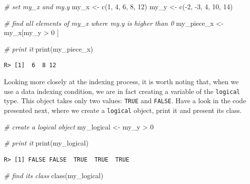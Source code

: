 \documentclass[
  12pt,
]{book}
\newenvironment{Shaded}{\begin{snugshade}}{\end{snugshade}}
\newcommand{\CommentTok}[1]{\textcolor[rgb]{0.37,0.37,0.37}{\textit{#1}}}
\newcommand{\DecValTok}[1]{\textcolor[rgb]{0.06,0.06,0.06}{#1}}
\newcommand{\FunctionTok}[1]{\textcolor[rgb]{0,0,0}{#1}}
\newcommand{\NormalTok}[1]{#1}
\newcommand{\OtherTok}[1]{\textcolor[rgb]{0.37,0.37,0.37}{#1}}
\newcommand{\SpecialCharTok}[1]{\textcolor[rgb]{0,0,0}{#1}}
\begin{document}
\begin{Shaded}
\begin{Highlighting}[]
\CommentTok{\# set my\_x and my.y}
\NormalTok{my\_x }\OtherTok{\textless{}{-}} \FunctionTok{c}\NormalTok{(}\DecValTok{1}\NormalTok{, }\DecValTok{4}\NormalTok{, }\DecValTok{6}\NormalTok{, }\DecValTok{8}\NormalTok{, }\DecValTok{12}\NormalTok{)}
\NormalTok{my\_y }\OtherTok{\textless{}{-}} \FunctionTok{c}\NormalTok{(}\SpecialCharTok{{-}}\DecValTok{2}\NormalTok{, }\SpecialCharTok{{-}}\DecValTok{3}\NormalTok{, }\DecValTok{4}\NormalTok{, }\DecValTok{10}\NormalTok{, }\DecValTok{14}\NormalTok{)}

\CommentTok{\# find all elements of my\_x where my.y is higher than 0}
\NormalTok{my\_piece\_x }\OtherTok{\textless{}{-}}\NormalTok{ my\_x[my\_y }\SpecialCharTok{\textgreater{}} \DecValTok{0}\NormalTok{ ]}

\CommentTok{\# print it}
\FunctionTok{print}\NormalTok{(my\_piece\_x)}
\end{Highlighting}
\end{Shaded}

\begin{verbatim}
R> [1]  6  8 12
\end{verbatim}

Looking more closely at the indexing process, it is worth noting that, when we use a data indexing condition, we are in fact creating a variable of the \texttt{logical} type. This object takes only two values: \texttt{TRUE} and \texttt{FALSE}. Have a look in the code presented next, where we create a \texttt{logical} object, print it and present its class.

\begin{Shaded}
\begin{Highlighting}[]
\CommentTok{\# create a logical object}
\NormalTok{my\_logical }\OtherTok{\textless{}{-}}\NormalTok{ my\_y }\SpecialCharTok{\textgreater{}} \DecValTok{0}

\CommentTok{\# print it}
\FunctionTok{print}\NormalTok{(my\_logical)}
\end{Highlighting}
\end{Shaded}

\begin{verbatim}
R> [1] FALSE FALSE  TRUE  TRUE  TRUE
\end{verbatim}

\begin{Shaded}
\begin{Highlighting}[]
\CommentTok{\# find its class}
\FunctionTok{class}\NormalTok{(my\_logical)}
\end{Highlighting}
\end{Shaded}
\end{document}
